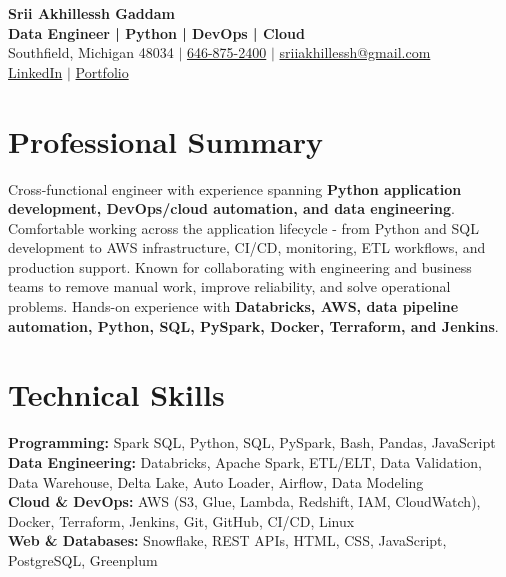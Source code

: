 \documentclass[letterpaper,10pt]{article}
\begin{document}
\fontsize{9.35pt}{10.45pt}\selectfont

\begin{center}
    {\LARGE \textbf{Srii Akhillessh Gaddam}} \\[-1pt]
    \textbf{Data Engineer | Python | DevOps | Cloud} \\[2pt]
    Southfield, Michigan 48034 $|$
    \href{tel:6468752400}{646-875-2400} $|$
    \href{mailto:sriiakhillessh@gmail.com}{sriiakhillessh@gmail.com} \\[1pt]
    \href{https://www.linkedin.com/in/srii-akhiilessh-gaddam-b48668191/}{LinkedIn} $|$
    \href{https://sriiakhillesshg.github.io/portfolio/}{Portfolio}
\end{center}
\vspace{-8pt}

\section{Professional Summary}
\small{Cross-functional engineer with experience spanning \textbf{Python application development, DevOps/cloud automation, and data engineering}. Comfortable working across the application lifecycle - from Python and SQL development to AWS infrastructure, CI/CD, monitoring, ETL workflows, and production support. Known for collaborating with engineering and business teams to remove manual work, improve reliability, and solve operational problems. Hands-on experience with \textbf{Databricks, AWS, data pipeline automation, Python, SQL, PySpark, Docker, Terraform, and Jenkins}.}

\section{Technical Skills}
\small{
\textbf{Programming:} Spark SQL, Python, SQL, PySpark, Bash, Pandas, JavaScript \\
\textbf{Data Engineering:} Databricks, Apache Spark, ETL/ELT, Data Validation, Data Warehouse, Delta Lake, Auto Loader, Airflow, Data Modeling \\
\textbf{Cloud \& DevOps:} AWS (S3, Glue, Lambda, Redshift, IAM, CloudWatch), Docker, Terraform, Jenkins, Git, GitHub, CI/CD, Linux \\
\textbf{Web \& Databases:} Snowflake, REST APIs, HTML, CSS, JavaScript, PostgreSQL, Greenplum
}
\end{document}
